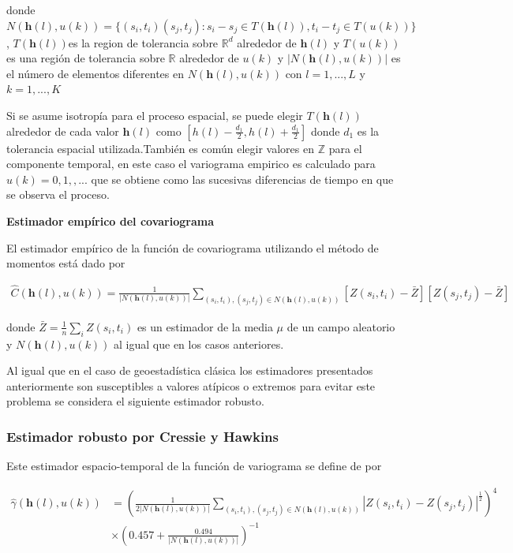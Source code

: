 \documentclass[
]{book}
\begin{document}
donde \(N(\textbf{h}(l),u(k))=\{(s_i,t_i)(s_j,t_j):s_i -s_j \in T(\textbf{h}(l)), t_i-t_j \in T(u(k))\}\), \(T(\textbf{h}(l))\)es la region de tolerancia sobre \(\mathbb{R}^d\) alrededor de \(\textbf{h}(l)\) y \(T(u(k))\) es una región de tolerancia sobre \(\mathbb{R}\) alrededor de \(u(k)\) y \(|N(\textbf{h}(l),u(k))|\) es el número de elementos diferentes en \(N(\textbf{h}(l),u(k))\) con \(l=1,...,L\) y \(k=1,...,K\)

Si se asume isotropía para el proceso espacial, se puede elegir \(T(\textbf{h}(l))\) alrededor de cada valor \(\textbf{h}(l)\) como \(\left[h(l)-\frac{d_1}{2}, h(l)+\frac{d_1}{2}\right]\) donde \(d_1\) es la tolerancia espacial utilizada.También es común elegir valores en \(\mathbb{Z}\) para el componente temporal, en este caso el variograma empirico es calculado para \(u(k)=0,1,,...\) que se obtiene como las sucesivas diferencias de tiempo en que se observa el proceso.

\textbf{Estimador empírico del covariograma}

El estimador empírico de la función de covariograma utilizando el método de momentos está dado por

\begin{align}
{\hat{C}}(\textbf{h}(l),u(k))=\frac{1}{|N(\textbf{h}(l),u(k))|} \sum_{(s_i,t_i),(s_j,t_j)\in N(\textbf{h}(l),u(k))} [Z(s_i,t_i)-{\bar{Z}}][Z(s_j,t_j)-\bar{Z}]
\end{align}

donde \(\bar{Z}=\frac{1}{n} \sum_{i} Z(s_i , t_i)\) es un estimador de la media \(\mu\) de un campo aleatorio y \(N(\textbf{h}(l),u(k))\) al igual que en los casos anteriores.

Al igual que en el caso de geoestadística clásica los estimadores presentados anteriormente son susceptibles a valores atípicos o extremos para evitar este problema se considera el siguiente estimador robusto.

\hypertarget{estimador-robusto-por-cressie-y-hawkins}{%
\subsubsection{Estimador robusto por Cressie y Hawkins}\label{estimador-robusto-por-cressie-y-hawkins}}

Este estimador espacio-temporal de la función de variograma se define de por

\begin{align}
{\hat{\gamma}}(\textbf{h}(l),u(k))&=\left({\frac{1}{2|N(\textbf{h}(l),u(k))|}}{\sum_{(s_i,t_i),(s_j,t_j)\in N(\textbf{h}(l),u(k))} {|Z(s_i,t_i)-Z(s_j,t_j)|^{\frac{1}{2}}}}\right)^4\\
& \times \left(0.457 + \frac{0.494}{|N(\textbf{h}(l),u(k))|} \right)^{-1}
\end{align}
\end{document}
